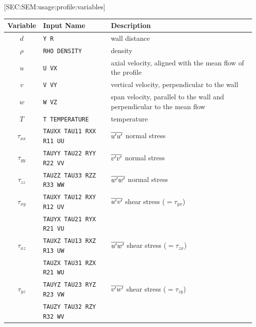 
[SEC:SEM:usage:profile:variables]
 
\vspace{0.5em}
%
\begingroup %
\newlength{\growsep} %
\setlength{\growsep}{0.50em}
\begin{tabular}{c @{\qquad} l @{\qquad} p{3.25in}}%
  Variable    & Input Name & Description \\
  \hline
  $d$         & \texttt{Y R}
              & wall distance \\
  $\rho$      & \texttt{RHO DENSITY}
              & density \\
  $u$         & \texttt{U VX}
              & axial velocity, aligned with the mean flow of the profile \\
  $v$         & \texttt{V VY}
              & vertical velocity, perpendicular to the wall \\
  $w$         & \texttt{W VZ}
              & span velocity, parallel to the wall and perpendicular to the
                mean flow \\
  $T$         & \texttt{T TEMPERATURE}
              & temperature \\[\growsep]
  $\tau_{xx}$ & \texttt{TAUXX TAU11 RXX R11 UU}
              & $\overline{u'u'}$ normal stress
                \\[\growsep]
  $\tau_{yy}$ & \texttt{TAUYY TAU22 RYY R22 VV}
              & $\overline{v'v'}$ normal stress
                \\[\growsep]
  $\tau_{zz}$ & \texttt{TAUZZ TAU33 RZZ R33 WW}
              & $\overline{w'w'}$ normal stress
                \\[\growsep]
  $\tau_{xy}$ & \texttt{TAUXY TAU12 RXY R12 UV}
              & $\overline{u'v'}$ shear stress ($=\tau_{yx}$) \\
              & \texttt{TAUYX TAU21 RYX R21 VU}
              & \\[\growsep]
  $\tau_{xz}$ & \texttt{TAUXZ TAU13 RXZ R13 UW}
              & $\overline{u'w'}$ shear stress ($=\tau_{zx}$) \\
              & \texttt{TAUZX TAU31 RZX R21 WU}
              & \\[\growsep]
  $\tau_{yz}$ & \texttt{TAUYZ TAU23 RYZ R23 VW}
              & $\overline{v'w'}$ shear stress ($=\tau_{zy}$) \\
              & \texttt{TAUZY TAU32 RZY R32 WV}
              & \\
  \hline
\end{tabular}
